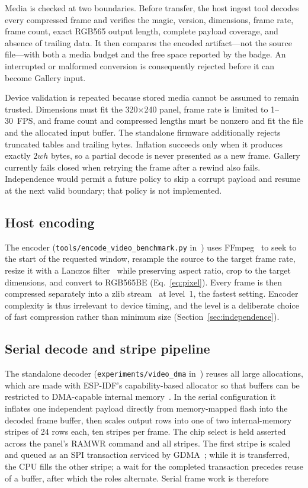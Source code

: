 \documentclass[11pt,twocolumn]{article}
\begin{document}
Media is checked at two boundaries.  Before transfer, the host ingest tool
decodes every compressed frame and verifies the magic, version, dimensions,
frame rate, frame count, exact RGB565 output length, complete payload
coverage, and absence of trailing data.  It then compares the encoded
artifact---not the source file---with both a media budget and the free space
reported by the badge.  An interrupted or malformed conversion is consequently
rejected before it can become Gallery input.

Device validation is repeated because stored media cannot be assumed to remain
trusted.  Dimensions must fit the 320$\times$240 panel, frame rate is limited
to 1--30~FPS, and frame count and compressed lengths must be nonzero and fit
the file and the allocated input buffer.  The standalone firmware
additionally rejects truncated tables and trailing bytes.  Inflation succeeds
only when it produces exactly $2wh$ bytes, so a partial decode is never
presented as a new frame.  Gallery currently fails closed when retrying the
frame after a rewind also fails.  Independence would permit a future policy
to skip a corrupt payload and resume at the next valid boundary; that policy
is not implemented.

\subsection{Host encoding}

The encoder (\texttt{tools/encode\_video\_benchmark.py}
in~\cite{bhattacharya2026oreo}) uses FFmpeg~\cite{ffmpeg} to seek to the
start of the requested window, resample the source to the target frame rate,
resize it with a Lanczos filter~\cite{duchon1979lanczos} while preserving
aspect ratio, crop to the target dimensions, and convert to RGB565BE
(Eq.~\eqref{eq:pixel}).  Every frame is then compressed separately into a
zlib stream~\cite{deutsch1996zlib} at level~1, the fastest setting.  Encoder
complexity is thus irrelevant to device timing, and the level is a deliberate
choice of fast compression rather than minimum size
(Section~\ref{sec:independence}).

\subsection{Serial decode and stripe pipeline}

The standalone decoder (\texttt{experiments/video\_dma}
in~\cite{bhattacharya2026oreo}) reuses all large allocations, which are made
with ESP-IDF's capability-based allocator so that buffers can be restricted
to DMA-capable internal memory~\cite{espressif2026memalloc}.  In the serial
configuration it inflates one independent payload directly from
memory-mapped flash into the decoded frame buffer, then scales output rows
into one of two internal-memory stripes of 24 rows each, ten stripes per
frame.  The chip select is held asserted across the panel's RAMWR command and
all stripes.  The first stripe is scaled and queued as an SPI transaction
serviced by GDMA~\cite{espressif2026spi,espressif2024trm}; while it is
transferred, the CPU fills the other stripe; a wait for the completed
transaction precedes reuse of a buffer, after which the roles alternate.
Serial frame work is therefore
\end{document}
